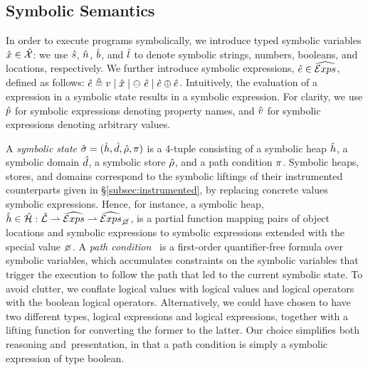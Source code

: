 \subsection{Symbolic Semantics}
In order to execute \jsil programs symbolically, we introduce typed symbolic variables $\hat{x} \in \hat{\mathcal{X}}$: 
we use $\hat{s}$, $\hat{n}$, $\hat{b}$, and $\hat{l}$ to denote symbolic strings, numbers, 
booleans, and locations, respectively. We further introduce symbolic expressions, $\hat{e} \in \widehat{\text{$\mathcal{E}xps$}}$, defined as follows: 
$\hat{e} \triangleq v \mid \hat{x} \mid \ominus\ \hat{e} \mid \hat{e} \oplus \hat{e}$. 
Intuitively, the evaluation of a \jsil expression in a symbolic state results in a symbolic expression. 
For clarity, we use $\hat{p}$ for symbolic expressions denoting property names, and $\hat{v}$ for symbolic
expressions denoting arbitrary values. 


A \emph{symbolic state} $\hat{\sigma} = (\hat{h}, \hat{d}, \hat\rho, \pi)$ is a 4-tuple consisting of a 
symbolic heap $\hat{h}$, a symbolic domain $\hat{d}$, a symbolic store $\hat\rho$, and a path condition $\pi$. 
Symbolic heaps, stores, and domains correspond to the symbolic liftings of their instrumented 
counterparts given in \S\ref{subsec:instrumented}, by replacing concrete values symbolic expressions. 
Hence, for instance, a symbolic heap, $\sheap \in \sheaps : \slocs \partialmap \sexprs \partialmap \setext{\sexprs}{\none}$,
is a partial function mapping pairs of object locations and symbolic expressions to symbolic expressions
extended with the special value $\none$. 
A \emph{path condition}~\cite{symb:exec:survey} is a first-order quantifier-free formula over symbolic variables, 
which accumulates constraints on the symbolic variables that trigger 
the execution to follow the path that led to the current symbolic state.
To avoid clutter, we conflate logical values with \jsil logical values and \jsil logical 
operators with the boolean logical operators. Alternatively, we could have chosen to 
have two different types, \jsil logical expressions and logical expressions, together with a lifting 
function for converting the former to the latter. Our choice simplifies both reasoning 
and~presentation, in that a path condition is simply a \jsil symbolic expression of type boolean. 

